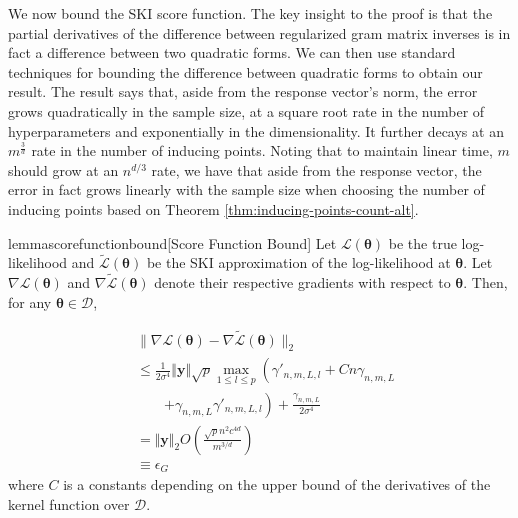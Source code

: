 We now bound the SKI score function. The key insight to the proof is that the partial derivatives of the difference between regularized gram matrix inverses is in fact a difference between two quadratic forms. We can then use standard techniques \citep{horn2012matrix} for bounding the difference between quadratic forms to obtain our result. The result says that, aside from the response vector's norm, the error grows quadratically in the sample size, at a square root rate in the number of hyperparameters and exponentially in the dimensionality. It further decays at an $m^{\frac{3}{d}}$ rate in the number of inducing points. Noting that to maintain linear time, $m$ should grow at an $n^{d/3}$ rate, we have that aside from the response vector, the error in fact grows linearly with the sample size when choosing the number of inducing points based on Theorem \ref{thm:inducing-points-count-alt}.
\begin{restatable}{lemma}{scorefunctionbound}[Score Function Bound]\label{lemma:score-function-bound}
Let $\mathcal{L}(\boldsymbol{\theta})$ be the true log-likelihood and $\tilde{\mathcal{L}}(\boldsymbol{\theta})$ be the SKI approximation of the log-likelihood at $\boldsymbol{\theta}$. Let $\nabla \mathcal{L}(\boldsymbol{\theta})$ and $\nabla \tilde{\mathcal{L}}(\boldsymbol{\theta})$ denote their respective gradients with respect to $\boldsymbol{\theta}$. Then, for any $\boldsymbol{\theta}\in \mathcal{D}$,

\begin{align*}
&\| \nabla \mathcal{L}(\boldsymbol{\theta}) - \nabla \tilde{\mathcal{L}}(\boldsymbol{\theta}) \|_2 \\
&\leq \frac{1}{2\sigma^4}\Vert \textbf{y}\Vert\sqrt{p}\max_{1\leq l\leq p} \left( \gamma'_{n,m,L,l}+Cn\gamma_{n,m,L}\right.\\
&\qquad\left.+\gamma_{n,m,L}\gamma'_{n,m,L,l} \right)+\frac{\gamma_{n,m,L}}{2\sigma^4}\\
&=\Vert \textbf{y}\Vert_2 O\left(\frac{\sqrt{p}n^2c^{4d}}{m^{3/d}}\right)\\
&\equiv \epsilon_G
\end{align*}
where $C$ is a constants depending on the upper bound of the derivatives of the kernel function over $\mathcal{D}$.
\end{restatable}

